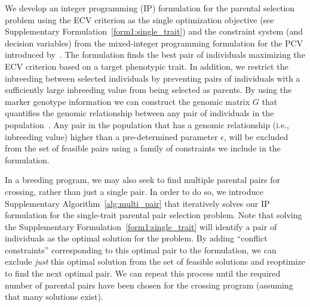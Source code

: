 \documentclass[12pt, a4paper, bibliography=totoc]{scrartcl}
\begin{document}
We develop an integer programming (IP) formulation for the parental selection problem using the ECV criterion as the single optimization objective (see Supplementary  Formulation~\eqref{form1:single_trait}) and the constraint system (and decision variables) from the mixed-integer programming formulation for the PCV  introduced by~\cite{han2017predicted}. The formulation finds the best pair of individuals maximizing the ECV criterion based on a target phenotypic trait. In addition, we restrict the inbreeding between selected individuals by preventing  pairs of individuals with a sufficiently large inbreeding value from being selected as parents. By using the marker genotype information we can construct the genomic matrix $G$ that quantifies the genomic relationship between any pair of individuals in the population~\citep{vanraden2008efficient}. Any pair in the population that has a genomic relationship (i.e., inbreeding value) higher than a pre-determined parameter $\epsilon$, will be excluded from the set of feasible pairs using a family of constraints we include in the formulation. 




 In a breeding program, we may also seek to find  multiple parental pairs for crossing, rather than just a single pair. In order to do so, we introduce Supplementary  Algorithm~\ref{alg:multi_pair}  that iteratively solves our IP formulation for the single-trait parental pair  selection problem. Note that solving the Supplementary  Formulation~\eqref{form1:single_trait} will identify a pair of individuals as the optimal solution for the problem. By adding ``conflict constraints'' corresponding to this optimal pair to the formulation, we can exclude \textit{just} this optimal solution from the set of  feasible solutions and reoptimize to find the next optimal pair. We can repeat this process until the required number of parental pairs have been chosen for the crossing program (assuming that many solutions exist). 
 
\end{document}
